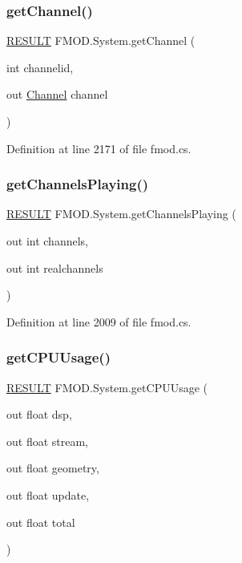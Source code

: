 \subsubsection{\texorpdfstring{get\+Channel()}{getChannel()}}
{\footnotesize\ttfamily \hyperlink{namespace_f_m_o_d_a305d1176ef3f8c8815861a60407ac33d}{R\+E\+S\+U\+LT} F\+M\+O\+D.\+System.\+get\+Channel (\begin{DoxyParamCaption}\item[{int}]{channelid,  }\item[{out \hyperlink{class_f_m_o_d_1_1_channel}{Channel}}]{channel }\end{DoxyParamCaption})}



Definition at line 2171 of file fmod.\+cs.

\mbox{\label{class_f_m_o_d_1_1_system_a47e187c6b757f0c208595b3566ee4c70}} 
\subsubsection{\texorpdfstring{get\+Channels\+Playing()}{getChannelsPlaying()}}
{\footnotesize\ttfamily \hyperlink{namespace_f_m_o_d_a305d1176ef3f8c8815861a60407ac33d}{R\+E\+S\+U\+LT} F\+M\+O\+D.\+System.\+get\+Channels\+Playing (\begin{DoxyParamCaption}\item[{out int}]{channels,  }\item[{out int}]{realchannels }\end{DoxyParamCaption})}



Definition at line 2009 of file fmod.\+cs.

\mbox{\label{class_f_m_o_d_1_1_system_a70db38932c0a9c8d7dfc1ed1500721d5}} 
\subsubsection{\texorpdfstring{get\+C\+P\+U\+Usage()}{getCPUUsage()}}
{\footnotesize\ttfamily \hyperlink{namespace_f_m_o_d_a305d1176ef3f8c8815861a60407ac33d}{R\+E\+S\+U\+LT} F\+M\+O\+D.\+System.\+get\+C\+P\+U\+Usage (\begin{DoxyParamCaption}\item[{out float}]{dsp,  }\item[{out float}]{stream,  }\item[{out float}]{geometry,  }\item[{out float}]{update,  }\item[{out float}]{total }\end{DoxyParamCaption})}



